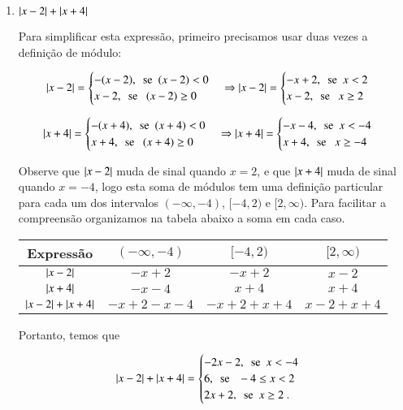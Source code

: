 \begin{exem}
\begin{enumerate}
 \item $\left|x-2\right| + \left|x+4\right|$

 Para simplificar esta expressão, primeiro precisamos usar duas vezes a definição de módulo:

 \[ \left|x-2\right| = \begin{cases}
      -(x-2), \ \ \text{se} \ \ (x-2)< 0 \\
      x-2, \ \ \text{se } \ \ (x-2) \geq 0
     \end{cases}
     \Rightarrow
     \left|x-2\right| = \begin{cases}
      -x + 2, \ \ \text{se} \ \ x < 2 \\
      x-2, \ \ \text{se } \ \ x \geq 2
     \end{cases}
  \]

 \[ \left|x+4\right| = \begin{cases}
      -(x+4), \ \ \text{se} \ \ (x+4)< 0 \\
      x+4, \ \ \text{se } \ \ (x+4) \geq 0
     \end{cases}
     \Rightarrow
     \left|x+4\right| = \begin{cases}
      -x - 4, \ \ \text{se} \ \ x < -4 \\
      x + 4, \ \ \text{se } \ \ x \geq -4
     \end{cases}
  \]

  Observe que $\left|x-2\right|$ muda de sinal quando $x=2$, e que $\left|x+4\right|$ muda de sinal quando $x=-4$, logo esta soma de módulos tem uma definição particular para cada um dos intervalos $(-\infty, -4)$, $[-4, 2)$ e $[2, \infty)$. Para facilitar a compreensão organizamos na tabela abaixo a soma em cada caso.

   \begin{table}[H]
 \centering
 \begin{tabular}{|c|c|c|c|} \hline
 \rowcolor{cinza}
  Expressão & $(-\infty, -4)$ & $[-4, 2)$ & $[2, \infty)$  \\\hline
  $\left|x-2\right|$ & $-x+2$ &  $-x+2$ & $x-2$ \\\hline
  $\left|x+4\right|$ & $-x-4$ &  $x+4$ & $x+4$ \\\hline
  $\left|x-2\right| + \left|x+4\right|$ & $-x+2-x-4$ & $-x+2+x+4$ & $x-2+x+4$ \\\hline
 \end{tabular}
\end{table}

 Portanto, temos que

  \[ \left|x-2\right| + \left|x+4\right| = \begin{cases}
      -2x-2, \ \ \text{se} \ \ x < -4 \\
      6, \ \ \text{se } \ \ -4 \leq x < 2 \\
      2x + 2, \ \ \text{se} \ \ x \geq 2 \ .
     \end{cases}
  \]

\end{enumerate}
\end{exem}

